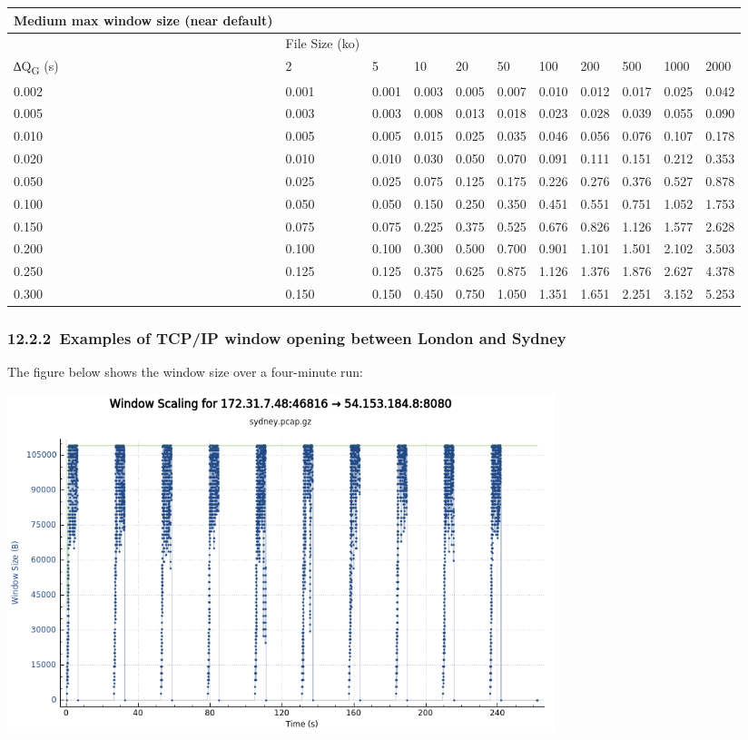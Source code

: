 \documentclass[11pt,a4paper]{article}
\begin{document}
\begin{longtable}[]{@{}lllllllllll@{}}
\toprule
Medium max window size (near default) & & & & & & & & & &\tabularnewline
\midrule
\endhead
& File Size (ko) & & & & & & & & &\tabularnewline
∆Q\textbar{}\textsubscript{G} (s) & 2 & 5 & 10 & 20 & 50 & 100 & 200 &
500 & 1000 & 2000\tabularnewline
0.002 & 0.001 & 0.001 & 0.003 & 0.005 & 0.007 & 0.010 & 0.012 & 0.017 &
0.025 & 0.042\tabularnewline
0.005 & 0.003 & 0.003 & 0.008 & 0.013 & 0.018 & 0.023 & 0.028 & 0.039 &
0.055 & 0.090\tabularnewline
0.010 & 0.005 & 0.005 & 0.015 & 0.025 & 0.035 & 0.046 & 0.056 & 0.076 &
0.107 & 0.178\tabularnewline
0.020 & 0.010 & 0.010 & 0.030 & 0.050 & 0.070 & 0.091 & 0.111 & 0.151 &
0.212 & 0.353\tabularnewline
0.050 & 0.025 & 0.025 & 0.075 & 0.125 & 0.175 & 0.226 & 0.276 & 0.376 &
0.527 & 0.878\tabularnewline
0.100 & 0.050 & 0.050 & 0.150 & 0.250 & 0.350 & 0.451 & 0.551 & 0.751 &
1.052 & 1.753\tabularnewline
0.150 & 0.075 & 0.075 & 0.225 & 0.375 & 0.525 & 0.676 & 0.826 & 1.126 &
1.577 & 2.628\tabularnewline
0.200 & 0.100 & 0.100 & 0.300 & 0.500 & 0.700 & 0.901 & 1.101 & 1.501 &
2.102 & 3.503\tabularnewline
0.250 & 0.125 & 0.125 & 0.375 & 0.625 & 0.875 & 1.126 & 1.376 & 1.876 &
2.627 & 4.378\tabularnewline
0.300 & 0.150 & 0.150 & 0.450 & 0.750 & 1.050 & 1.351 & 1.651 & 2.251 &
3.152 & 5.253\tabularnewline
\bottomrule
\end{longtable}

\hypertarget{examples-of-tcpip-window-opening-between-london-and-sydney}{%
\subsubsection{​12.2.2​~Examples of TCP/IP window opening between London
and Sydney
}\label{examples-of-tcpip-window-opening-between-london-and-sydney}}

The figure below shows the window size over a four-minute run:

\includegraphics[width=6.27083in,height=3.88889in]{./media/image1.png}
\end{document}
